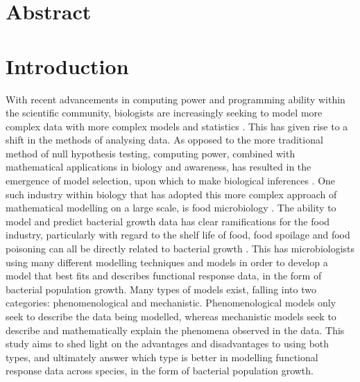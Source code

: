 \documentclass[11pt, a4paper]{article} %
\begin{document}
\linenumbers %
\linespread{2} %

\section{Abstract}

\section{Introduction}

With recent advancements in computing power and programming ability within the scientific community, biologists are increasingly seeking to model more complex data with more complex models and statistics \citep{RN69, RN107}. This has given rise to a shift in the methods of analysing data. As opposed to the more traditional method of null hypothesis testing, computing power, combined with mathematical applications in biology and awareness, has resulted in the emergence of model selection, upon which to make biological inferences \citep{RN68}. One such industry within biology that has adopted this more complex approach of mathematical modelling on a large scale, is food microbiology \citep{RN108, RN105}. The ability to model and predict bacterial growth data has clear ramifications for the food industry, particularly with regard to the shelf life of food, food spoilage and food poisoning can all be directly related to bacterial growth \citep{RN106}. This has microbiologists using many different modelling techniques and models in order to develop a model that best fits and describes functional response data, in the form of bacterial population growth. Many types of models exist, falling into two categories: phenomenological and mechanistic. Phenomenological models only seek to describe the data being modelled, whereas mechanistic models seek to describe and mathematically explain the phenomena observed in the data. This study aims to shed light on the advantages and disadvantages to using both types, and ultimately answer which type is better in modelling functional response data across species, in the form of bacterial population growth.
\end{document}
